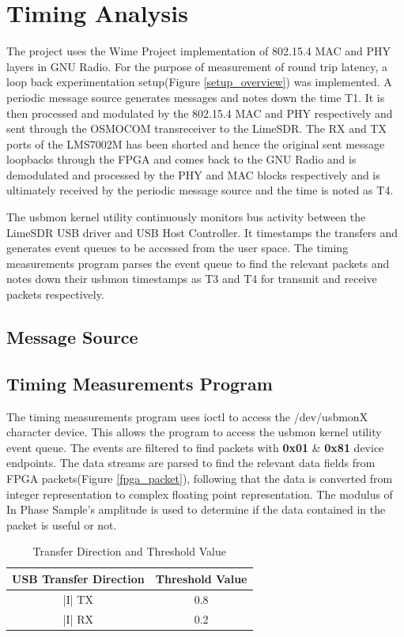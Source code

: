 \section{Timing Analysis}

The project uses the Wime Project implementation of 802.15.4 MAC and PHY layers in GNU Radio. For the purpose of measurement of round trip latency, a loop back experimentation setup(Figure \ref{setup_overview}) was implemented. A periodic message source generates messages and notes down the time T1. It is then processed and modulated by the 802.15.4 MAC and PHY respectively and sent through the OSMOCOM transreceiver to the LimeSDR. The RX and TX ports of the LMS7002M has been shorted and hence the original sent message loopbacks through the FPGA and comes back to the GNU Radio and is demodulated and processed by the PHY and MAC blocks respectively and is ultimately received by the periodic message source and the time is noted as T4.

The usbmon kernel utility continuously monitors bus activity between the LimeSDR USB driver and USB Host Controller. It timestamps the transfers and generates event queues to be accessed from the user space. The timing measurements program parses the event queue to find the relevant packets and notes down their usbmon timestamps as T3 and T4 for transmit and receive packets respectively.  
\subsection{Message Source} \label{message_source}

\subsection{Timing Measurements Program}
The timing measurements program uses ioctl to access the /dev/usbmonX character device. This allows the program to access the usbmon kernel utility event queue. The events are filtered to find packets with \textbf{0x01} \& \textbf{0x81} device endpoints. The data streams are parsed to find the relevant data fields from FPGA packets(Figure \ref{fpga_packet}), following that the data is converted from integer representation to complex floating point representation. The modulus of In Phase Sample's amplitude is used to determine if the data contained in the packet is useful or not. 

\begin{table}
\centering
\begin{tabular}{|c|c|}
\hline
USB Transfer Direction & Threshold Value  \\
\hline
|I| TX & 0.8\\
|I| RX & 0.2\\
\hline
\end{tabular}
\caption{Transfer Direction and Threshold Value}
\label{thres_table}
\end{table}


